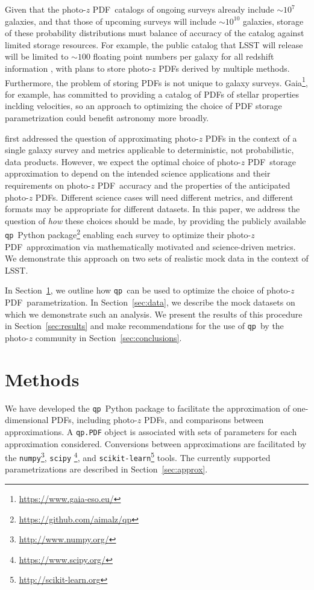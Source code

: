 \documentclass[\docopts]{\docclass}
\newcommand{\qp}{\texttt{qp}}
\newcommand{\pz}{photo-$z$ PDF}
\begin{document}
Given that the \pz\ catalogs of ongoing surveys already include $\sim10^{7}$ 
galaxies, and that those of upcoming surveys will include $\sim10^{10}$ 
galaxies, storage of these probability distributions must balance of accuracy 
of the catalog against limited storage resources.
For example, the public catalog that LSST will release will be limited to 
$\sim100$ floating point numbers per galaxy for all redshift information 
\citep[Section 4.2.2]{juric_data_2017}, with plans to store \pz s derived by 
multiple methods.
Furthermore, the problem of storing PDFs is not unique to galaxy surveys.
Gaia\footnote{\url{https://www.gaia-eso.eu/}}, for example, has committed to 
providing a catalog of PDFs of stellar properties inclding velocities, so an 
approach to optimizing the choice of PDF storage parametrization could benefit 
astronomy more broadly.

\citet{carrasco_kind_sparse_2014} first addressed the question of approximating 
\pz s in the context of a single galaxy survey and metrics applicable to 
deterministic, not probabilistic, data products.
However, we expect the optimal choice of \pz\ storage approximation to depend 
on the intended science applications and their requirements on \pz\ accuracy 
and the properties of the anticipated \pz s.
Different science cases will need different metrics, and different formats may 
be appropriate for different datasets.
In this paper, we address the question of \textit{how} these choices should be 
made, by providing the publicly available \qp\ Python 
package\footnote{\url{https://github.com/aimalz/qp}} enabling each survey to 
optimize their \pz\ approximation via mathematically motivated and 
science-driven metrics.
We demonstrate this approach on two sets of realistic mock data in the context 
of LSST.

In Section~\ref{sec:methods}, we outline how \qp\ can be used to optimize the 
choice of \pz\ parametrization.
In Section~\ref{sec:data}, we describe the mock datasets on which we 
demonstrate such an analysis.
We present the results of this procedure in Section~\ref{sec:results} and make 
recommendations for the use of \qp\ by the photo-$z$ community in 
Section~\ref{sec:conclusions}.

\section{Methods}
\label{sec:methods}


We have developed the \qp\ Python package to facilitate the approximation of 
one-dimensional PDFs, including \pz s, and comparisons between approximations.
A \texttt{qp.PDF} object is associated with sets of parameters for each 
approximation considered.
Conversions between approximations are facilitated by the 
\texttt{numpy}\footnote{\url{http://www.numpy.org/}}, \texttt{scipy} 
\footnote{\url{https://www.scipy.org/}}, and 
\texttt{scikit-learn}\footnote{\url{http://scikit-learn.org}} 
\citep{pedregosa_scikit-learn:_2011} tools.
The currently supported parametrizations are described in 
Section~\ref{sec:approx}.
\end{document}
